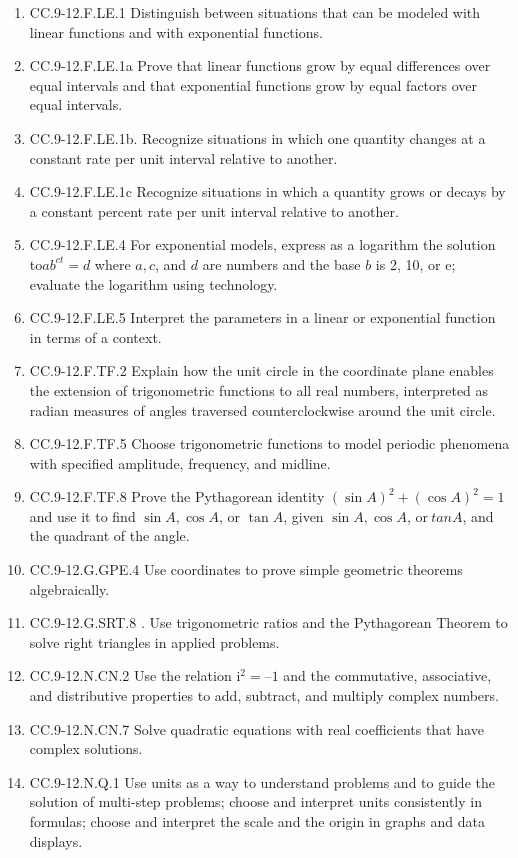 \documentclass{article}
\begin{document}
\begin{enumerate}
	\item CC.9-12.F.LE.1  Distinguish between situations that can be modeled with linear functions and with exponential functions.
	\item CC.9-12.F.LE.1a Prove that linear functions grow by equal differences over equal intervals and that exponential functions grow by equal factors over equal intervals.
	\item CC.9-12.F.LE.1b. Recognize situations in which one quantity changes at a constant rate per unit interval relative to another.
	\item CC.9-12.F.LE.1c Recognize situations in which a quantity grows or decays by a constant percent rate per unit interval relative to another.
	\item CC.9-12.F.LE.4 For exponential models, express as a logarithm the solution to$ ab^{ct} = d$ where $a, c$, and $d$ are numbers and the base $b$ is 2, 10, or e; evaluate the logarithm using technology.
	\item CC.9-12.F.LE.5  Interpret the parameters in a linear or exponential function in terms of a context.
	\item CC.9-12.F.TF.2  Explain how the unit circle in the coordinate plane enables the extension of trigonometric functions to all real numbers, interpreted as radian measures of angles traversed counterclockwise around the unit circle.
	\item CC.9-12.F.TF.5  Choose trigonometric functions to model periodic phenomena with specified amplitude, frequency, and midline.
	\item CC.9-12.F.TF.8  Prove the Pythagorean identity $(\sin A)^2 + (\cos A)^2 = 1$ and use it to find $\sin A, \cos A$, or $\tan A$, given $\sin A, \cos A$, or$\ tan A$, and the quadrant of the angle.
	\item CC.9-12.G.GPE.4 Use coordinates to prove simple geometric theorems algebraically. 
	\item CC.9-12.G.SRT.8 . Use trigonometric ratios and the Pythagorean Theorem to solve right triangles in applied problems.
	\item CC.9-12.N.CN.2 Use the relation $\textrm{i}^2 = –1$ and the commutative, associative, and distributive properties to add, subtract, and multiply complex numbers.
	\item CC.9-12.N.CN.7  Solve quadratic equations with real coefficients that have complex solutions.
	\item CC.9-12.N.Q.1  Use units as a way to understand problems and to guide the solution of multi-step problems; choose and interpret units consistently in formulas; choose and interpret the scale and the origin in graphs and data displays.

\end{enumerate}
\end{document}
